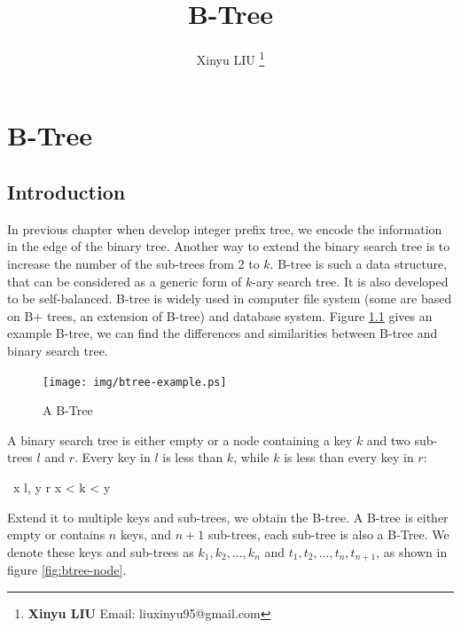 \documentclass[b5paper]{article}
\begin{document}
\title{B-Tree}

\author{Xinyu LIU
\thanks{{\bfseries Xinyu LIU} \newline
  Email: liuxinyu95@gmail.com \newline}
  }

\maketitle
\fi


\ifx\wholebook\relax
\chapter{B-Tree}
\fi

\section{Introduction}
\label{introduction}

In previous chapter when develop integer prefix tree, we encode the information in the edge of the binary tree. Another way to extend the binary search tree is to increase the number of the sub-trees from 2 to $k$. B-tree is such a data structure, that can be considered as a generic form of $k$-ary search tree. It is also developed to be self-balanced\cite{wiki-b-tree}. B-tree is widely used in computer file system (some are based on B+ trees, an extension of B-tree) and database system. Figure \ref{fig:btree-example} gives an example B-tree, we can find the differences and similarities between B-tree and binary search tree.

\begin{figure}[htbp]
  \centering
  \texttt{[image: img/btree-example.ps]}
  \caption{A B-Tree}
  \label{fig:btree-example}
\end{figure}

A binary search tree is either empty or a node containing a key $k$ and two sub-trees $l$ and $r$. Every key in $l$ is less than $k$, while $k$ is less than every key in $r$:

\be
\forall\ x \in l, y \in r \Rightarrow x < k < y
\ee

Extend it to multiple keys and sub-trees, we obtain the B-tree. A B-tree is either empty or contains $n$ keys, and $n + 1$ sub-trees, each sub-tree is also a B-Tree. We denote these keys and sub-trees as $k_1, k_2, ..., k_n$ and $t_1, t_2, ..., t_n, t_{n+1}$, as shown in figure \ref{fig:btree-node}.
\end{document}
